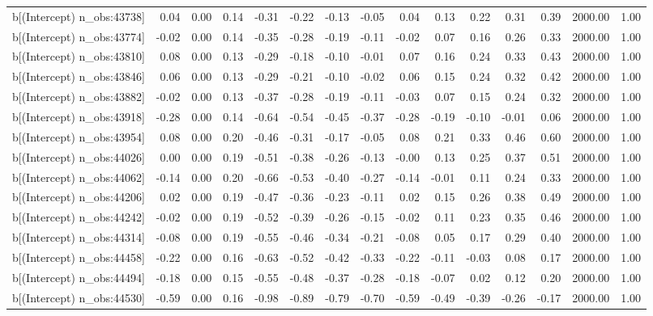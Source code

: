 \begin{table}[ht]
\begin{tabular}{rrrrrrrrrrrrrrr}
  b[(Intercept) n\_obs:43738] & 0.04 & 0.00 & 0.14 & -0.31 & -0.22 & -0.13 & -0.05 & 0.04 & 0.13 & 0.22 & 0.31 & 0.39 & 2000.00 & 1.00 \\ 
  b[(Intercept) n\_obs:43774] & -0.02 & 0.00 & 0.14 & -0.35 & -0.28 & -0.19 & -0.11 & -0.02 & 0.07 & 0.16 & 0.26 & 0.33 & 2000.00 & 1.00 \\ 
  b[(Intercept) n\_obs:43810] & 0.08 & 0.00 & 0.13 & -0.29 & -0.18 & -0.10 & -0.01 & 0.07 & 0.16 & 0.24 & 0.33 & 0.43 & 2000.00 & 1.00 \\ 
  b[(Intercept) n\_obs:43846] & 0.06 & 0.00 & 0.13 & -0.29 & -0.21 & -0.10 & -0.02 & 0.06 & 0.15 & 0.24 & 0.32 & 0.42 & 2000.00 & 1.00 \\ 
  b[(Intercept) n\_obs:43882] & -0.02 & 0.00 & 0.13 & -0.37 & -0.28 & -0.19 & -0.11 & -0.03 & 0.07 & 0.15 & 0.24 & 0.32 & 2000.00 & 1.00 \\ 
  b[(Intercept) n\_obs:43918] & -0.28 & 0.00 & 0.14 & -0.64 & -0.54 & -0.45 & -0.37 & -0.28 & -0.19 & -0.10 & -0.01 & 0.06 & 2000.00 & 1.00 \\ 
  b[(Intercept) n\_obs:43954] & 0.08 & 0.00 & 0.20 & -0.46 & -0.31 & -0.17 & -0.05 & 0.08 & 0.21 & 0.33 & 0.46 & 0.60 & 2000.00 & 1.00 \\ 
  b[(Intercept) n\_obs:44026] & 0.00 & 0.00 & 0.19 & -0.51 & -0.38 & -0.26 & -0.13 & -0.00 & 0.13 & 0.25 & 0.37 & 0.51 & 2000.00 & 1.00 \\ 
  b[(Intercept) n\_obs:44062] & -0.14 & 0.00 & 0.20 & -0.66 & -0.53 & -0.40 & -0.27 & -0.14 & -0.01 & 0.11 & 0.24 & 0.33 & 2000.00 & 1.00 \\ 
  b[(Intercept) n\_obs:44206] & 0.02 & 0.00 & 0.19 & -0.47 & -0.36 & -0.23 & -0.11 & 0.02 & 0.15 & 0.26 & 0.38 & 0.49 & 2000.00 & 1.00 \\ 
  b[(Intercept) n\_obs:44242] & -0.02 & 0.00 & 0.19 & -0.52 & -0.39 & -0.26 & -0.15 & -0.02 & 0.11 & 0.23 & 0.35 & 0.46 & 2000.00 & 1.00 \\ 
  b[(Intercept) n\_obs:44314] & -0.08 & 0.00 & 0.19 & -0.55 & -0.46 & -0.34 & -0.21 & -0.08 & 0.05 & 0.17 & 0.29 & 0.40 & 2000.00 & 1.00 \\ 
  b[(Intercept) n\_obs:44458] & -0.22 & 0.00 & 0.16 & -0.63 & -0.52 & -0.42 & -0.33 & -0.22 & -0.11 & -0.03 & 0.08 & 0.17 & 2000.00 & 1.00 \\ 
  b[(Intercept) n\_obs:44494] & -0.18 & 0.00 & 0.15 & -0.55 & -0.48 & -0.37 & -0.28 & -0.18 & -0.07 & 0.02 & 0.12 & 0.20 & 2000.00 & 1.00 \\ 
  b[(Intercept) n\_obs:44530] & -0.59 & 0.00 & 0.16 & -0.98 & -0.89 & -0.79 & -0.70 & -0.59 & -0.49 & -0.39 & -0.26 & -0.17 & 2000.00 & 1.00 \\ 

\end{tabular}
\end{table}
